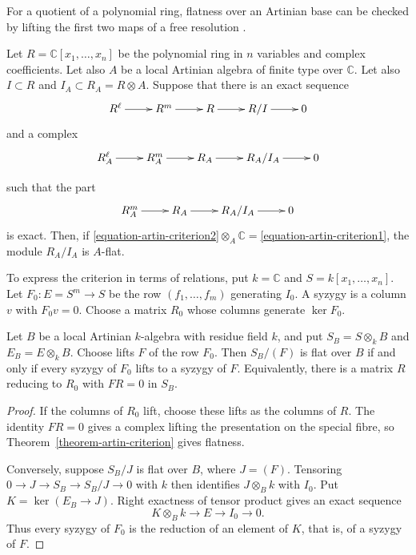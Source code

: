 For a quotient of a polynomial ring,
flatness over an Artinian base can be
checked by lifting the first two maps
of a free resolution
\cite[Theorem 3.15]{Graffeo-Alessi}.

\begin{theorem}
\label{theorem-artin-criterion}
Let $R=\mathbb{C}[x_1,…,x_n]$ be the polynomial ring
in $n$ variables and complex coefficients.
Let also $A$ be a local Artinian algebra of finite type over $\mathbb{C}$.
Let also $I \subset R$ and $I_A \subset R_A=R\otimes A$.
Suppose that there is an exact sequence
\begin{equation}
\label{equation-artin-criterion1}
\xymatrix{
R^\ell\ar[r]
&R^m\ar[r]
&R\ar[r]
&R/I\ar[r]
&0
}
\end{equation}
\noindent
and a complex
\begin{equation}
\label{equation-artin-criterion2}
\xymatrix{
R^\ell_A\ar[r]
&R^m_A\ar[r]
&R_A\ar[r]
&R_A/I_A\ar[r]
&0
}
\end{equation}

\noindent
such that the part
$$
\xymatrix{
R^m_A\ar[r]
&R_A\ar[r]
&R_A/I_A\ar[r]
&0
}
$$
is exact. Then, if
\ref{equation-artin-criterion2}$\otimes_A\mathbb{C}
=$\ref{equation-artin-criterion1},
the module $R_A/I_A$ is $A$-flat.
\end{theorem}

\noindent
To express the criterion in terms of
relations, put $k=\mathbb C$ and
$S=k[x_1,\ldots,x_n]$.
Let $F_0:E=S^m\to S$ be the row
$(f_1,\ldots,f_m)$ generating $I_0$.
A syzygy is a column $v$ with $F_0v=0$.
Choose a matrix $R_0$ whose columns
generate $\ker F_0$.

\begin{corollary}
\label{corollary-flatness-lifting-syzygies}
Let $B$ be a local Artinian $k$-algebra
with residue field $k$, and put
$S_B=S\otimes_k B$ and $E_B=E\otimes_k B$.
Choose lifts $F$ of the row $F_0$. Then
$S_B/(F)$ is flat over $B$ if and only if
every syzygy of $F_0$ lifts to a syzygy of
$F$. Equivalently, there is a matrix $R$
reducing to $R_0$ with $FR=0$ in $S_B$.
\end{corollary}

\begin{proof}
If the columns of $R_0$ lift, choose
these lifts as the columns of $R$.
The identity $FR=0$ gives a complex
lifting the presentation on the special
fibre, so
Theorem~\ref{theorem-artin-criterion}
gives flatness.

Conversely, suppose $S_B/J$ is flat over
$B$, where $J=(F)$. Tensoring
$0\to J\to S_B\to S_B/J\to0$ with $k$
then identifies $J\otimes_B k$ with $I_0$.
Put $K=\ker(E_B\to J)$. Right exactness
of tensor product gives an exact sequence
$$
K\otimes_B k\longrightarrow E
\longrightarrow I_0\longrightarrow 0.
$$
Thus every syzygy of $F_0$ is the
reduction of an element of $K$, that is,
of a syzygy of $F$.
\end{proof}

